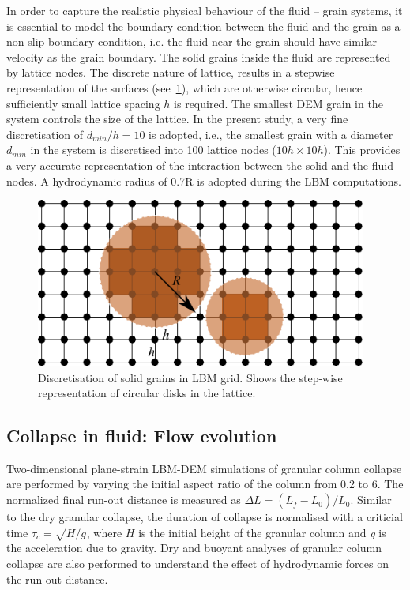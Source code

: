 In order to capture the realistic physical behaviour of the fluid – grain 
systems, it is essential to model the boundary condition between the fluid and 
the grain 
as a non-slip boundary condition, i.e. the fluid near the grain should have 
similar velocity as the grain boundary. The solid grains inside the fluid are 
represented by lattice nodes. The discrete nature of lattice, results in a 
stepwise representation of the surfaces (see~\cref{fig:LBM-DEM}), which are 
otherwise circular, hence sufficiently small lattice spacing $h$ is required. 
The smallest DEM grain in the system controls the size of the lattice. In the 
present study, a very fine discretisation of $d_{min}/h = 10$ is adopted, 
i.e., the smallest grain with a diameter $d_{min}$ in the system is discretised 
into 100 lattice nodes ($ 10h \times 10h$). This provides a very accurate 
representation of the interaction between the solid and the fluid nodes.  A 
hydrodynamic radius of 0.7R is adopted during the LBM computations. 

\begin{figure}[htpb]
\centering
\includegraphics[width=0.97\textwidth]{LBM-DEM}
\caption{Discretisation of solid grains in LBM grid. Shows the step-wise 
representation of circular disks in the lattice.}
\label{fig:LBM-DEM}
\end{figure}


\subsection{Collapse in fluid: Flow evolution}
\label{sec:collapse_fluid_evolution}
Two-dimensional plane-strain LBM-DEM simulations of granular column 
collapse are performed by varying the initial aspect ratio of the column from 
0.2 to 6. The normalized final run-out distance is measured as $\Delta L = 
(L_{\textit{f}}-L_{\textit{0}})/L_{\textit{0}}$. Similar to the dry granular 
collapse, the duration of collapse is normalised with a criticial time $\tau_c 
= \sqrt{H/g}$, where $H$ is the initial height of the granular column and 
\textit{g} is 
the acceleration due to gravity.  Dry and buoyant analyses of granular column 
collapse are also performed to understand the effect of hydrodynamic forces on 
the run-out distance.

